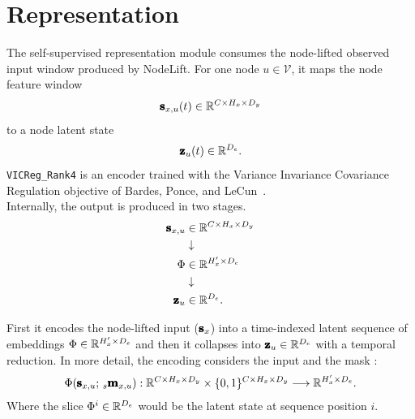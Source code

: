 \newpage{}
\section{Representation}
\label{sec:representation}

The self-supervised representation module consumes the node-lifted observed
input window produced by NodeLift.  For one node $u\in\mathcal{V}$, it maps
the node feature window
\[
  \pmb{\mathbf{s}}_{x,u}(t)
  \in
  \mathbb{R}^{C\times H_x\times D_y}
\]
to a node latent state
\[
  \pmb{\mathbf{z}}_{u}(t)
  \in
  \mathbb{R}^{D_e}.
\]
\texttt{VICReg\_Rank4}%
is an encoder trained with the Variance Invariance Covariance Regulation objective of
Bardes, Ponce, and LeCun~\cite{bardes2022vicreg}.\\


Internally, the output is produced in two stages. 
\[
\begin{aligned}
  \pmb{\mathbf{s}}_{x,u}
  &\in \mathbb{R}^{C \times H_x \times D_y} \\
  &\downarrow \\
  \Phi &\in \mathbb{R}^{H_x' \times D_e} \\
  &\downarrow \\
  \pmb{\mathbf{z}}_{u} &\in \mathbb{R}^{D_e}.
\end{aligned}
\]


First it encodes the node-lifted input ($\pmb{\mathbf{s}}_{x}$) into a time-indexed latent sequence of embeddings 
$\Phi \in \mathbb{R}^{H_x' \times D_e}$ 
and then it collapses into $\pmb{\mathbf{z}}_{u} \in \mathbb{R}^{D_e}$ with a temporal reduction. 
In more detail, the encoding considers the input and the mask%
: 
\[
  \Phi(\pmb{\mathbf{s}}_{x,u};\,{}_{s}\pmb{\mathbf{m}}_{x,u}) :
  \mathbb{R}^{C \times H_x \times D_y}
  \times
  \{0,1\}^{C \times H_x\times D_y}
  \longrightarrow
  \mathbb{R}^{H_x' \times D_e}.\\
\]
Where the slice $\Phi^{i} \in \mathbb{R}^{D_e}$ would be the latent state at sequence position $i$. \\

